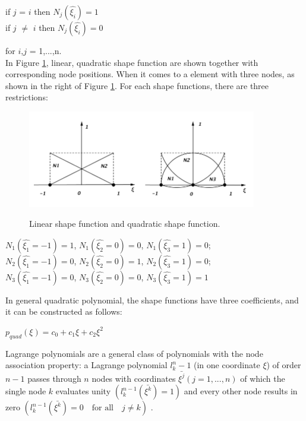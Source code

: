 \documentclass{article}
\begin{document}
\begin{center}
	if $j$ = $i$ then $N_j\left(\hat{\xi_i}\right) = 1$ \\
	if $j$ $\neq$ $i$ then $N_j\left(\hat{\xi_i}\right) = 0$
\end{center}

for $i$,$j$ = 1,...,n. \\
In Figure \ref{fig: shape_func}, linear, quadratic shape function are shown together with corresponding node positions. When it comes to a element with three nodes, as shown in the right of Figure \ref{fig: shape_func}. For each shape functions, there are three restrictions:

\begin{figure}
	\begin{center}
			\includegraphics[width=10cm,clip]{shape_func.pdf} \label{fig: shape_func}			
			\caption{Linear shape function and quadratic shape function.}
	\end{center}
\end{figure}

\begin{center}
	$N_1\left(\hat{\xi_1} = -1\right) = 1$, $N_1\left(\hat{\xi_2} = 0\right) = 0$, $N_1\left(\hat{\xi_3} = 1\right) = 0$;\\
	$N_2\left(\hat{\xi_1} = -1\right) = 0$, $N_2\left(\hat{\xi_2} = 0\right) = 1$, $N_2\left(\hat{\xi_3} = 1\right) = 0$;\\
	$N_3\left(\hat{\xi_1} = -1\right) = 0$, $N_3\left(\hat{\xi_2} = 0\right) = 0$, $N_3\left(\hat{\xi_3} = 1\right) = 1$
\end{center}

In general quadratic polynomial, the shape functions have three coefficients, and it can be constructed as follows:
\begin{center}
	 $p_{quad}\left(\xi\right) = c_0 + c_1\xi + c_2\xi^2$
\end{center}

Lagrange polynomials are a general class of polynomials with the node association property: a Lagrange polynomial $l_k^n-1$ (in one coordinate $\xi$) of order $n-1$ passes through $n$ nodes with coordinates $\bar{\xi^j}\left(j = 1,...,n\right)$ of which the single node $k$ evaluates unity $\left(l_k^{n-1} \left(\bar{\xi^k}\right)=1\right)$ and every other node results in zero $\left(l_k^{n-1} \left(\bar{\xi^k}\right)=0  \quad \text{for all} \quad j \neq k\right)$ .
\end{document}
